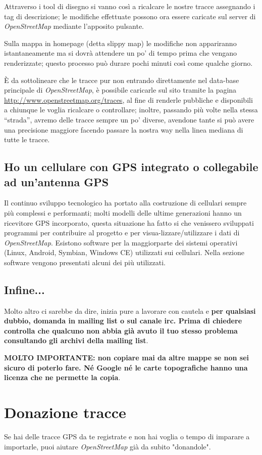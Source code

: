 \documentclass[a4paper,twoside,12pt,]{article}
\newcommand{\osm}{\emph{OpenStreetMap}\xspace}
\newcommand{\gps}{GPS\xspace}
\begin{document}
Attraverso i tool di disegno si vanno così a ricalcare le nostre tracce assegnando i tag di descrizione; le modifiche effettuate possono ora essere caricate sul server di \osm mediante l'apposito pulsante.

Sulla mappa in homepage (detta slippy map) le modifiche non appariranno istantaneamente ma si dovrà attendere un po' di tempo prima che vengano renderizzate; questo processo può durare pochi minuti così come qualche giorno.

È da sottolineare che le tracce pur non entrando direttamente nel data-base principale di \osm, è possibile caricarle sul sito tramite la pagina \url{http://www.openstreetmap.org/traces}, al fine di renderle pubbliche e disponibili a chiunque le voglia ricalcare o controllare; inoltre, passando più volte nella stessa ``strada'', avremo delle tracce sempre un po' diverse, avendone tante si può avere una precisione maggiore facendo passare la nostra way nella linea mediana di tutte le tracce.
\subsection{Ho un cellulare con \gps integrato o collegabile ad un'antenna \gps}
Il continuo sviluppo tecnologico ha portato alla costruzione di cellulari sempre più complessi e performanti; molti modelli delle ultime generazioni hanno un ricevitore \gps incorporato, questa situazione ha fatto si che venissero sviluppati programmi per contribuire al progetto e per visua-lizzare/utilizzare i dati di \osm. Esistono software per la maggiorparte dei sistemi operativi (Linux, Android, Symbian, Windows CE) utilizzati sui cellulari. Nella sezione software vengono presentati alcuni dei più utilizzati.

\subsection{Infine...}
Molto altro ci sarebbe da dire, inizia pure a lavorare con cautela e \textbf{per qualsiasi dubbio, domanda in mailing list o sul canale irc. Prima di chiedere controlla che qualcuno non abbia già avuto il tuo stesso problema consultando gli archivi della mailing list}.

\textbf{MOLTO IMPORTANTE: non copiare mai da altre mappe se non sei sicuro di poterlo fare. Né Google né le carte topografiche hanno una licenza che ne permette la copia}.

\section{Donazione tracce}
Se hai delle tracce \gps da te registrate e non hai voglia o tempo di imparare a importarle, puoi aiutare \osm già da subito "donandole".
\end{document}
